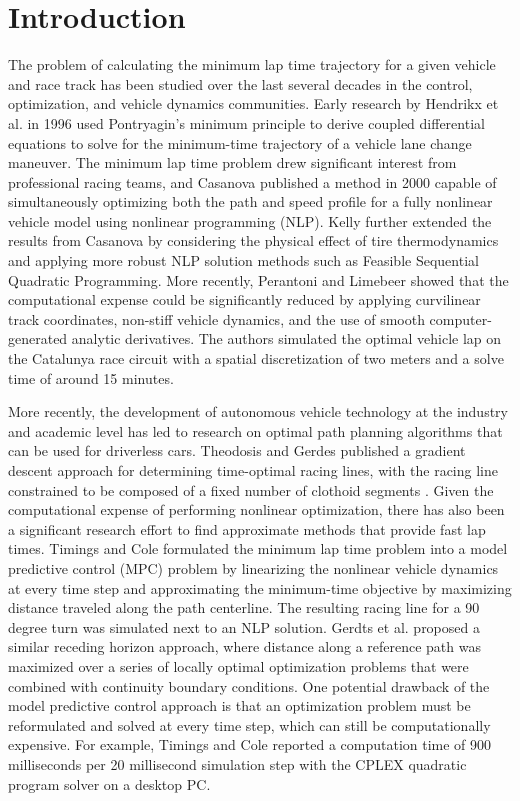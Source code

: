\documentclass[twocolumn,10pt]{asme2ej}
\begin{document}
\section{Introduction}
The problem of calculating the minimum lap time trajectory for a given vehicle and race track has been studied over the last several decades
in the control, optimization, and vehicle dynamics communities.  Early research by Hendrikx et al. \cite{hendrikx} in 1996 used 
 Pontryagin's minimum principle to derive coupled differential equations to solve for the minimum-time trajectory
of a vehicle lane change maneuver. The minimum lap time problem drew significant interest from professional racing teams, and
Casanova \cite{casanova} published a method in 2000 capable of simultaneously optimizing both the path and speed profile
for a fully nonlinear vehicle model using nonlinear programming (NLP). Kelly \cite{kelly} further extended the results from Casanova by considering
the physical effect of tire thermodynamics and applying more robust NLP solution methods such as Feasible Sequential Quadratic Programming. More recently,
Perantoni and Limebeer \cite{perantoni} showed that the computational expense could be significantly reduced by 
applying curvilinear track coordinates, non-stiff vehicle dynamics, and the use of smooth computer-generated
analytic derivatives. The authors simulated the optimal vehicle lap on the Catalunya race circuit with a spatial discretization
of two meters and a solve time of around 15 minutes. 

More recently, the development of autonomous vehicle technology at the industry and academic level has led to research on optimal path
 planning algorithms that can be used for driverless cars. Theodosis and Gerdes published a gradient descent approach for determining time-optimal
  racing lines, with the racing line constrained to be composed of a fixed number of clothoid segments \cite{theodosis}. Given the computational expense
 of performing nonlinear optimization, there has also been a significant research effort to find approximate methods that provide fast lap times.
 Timings and Cole \cite{timings} formulated the minimum lap time problem into a model predictive control (MPC) problem by linearizing the nonlinear vehicle
 dynamics at every time step and approximating the minimum-time objective by maximizing distance traveled along the path centerline. The resulting racing line
 for a 90 degree turn was simulated next to an NLP solution. Gerdts et al.  \cite{gerdts} proposed a similar receding horizon approach, where distance along a reference path was maximized over a series of locally optimal optimization
 problems that were combined with continuity boundary conditions. One potential drawback of the model predictive control approach is that an optimization
 problem must be reformulated and solved at every time step, which can still be computationally expensive. For example, Timings and Cole reported a computation time of 900 milliseconds
 per 20 millisecond simulation step with the CPLEX quadratic program solver on a desktop PC.
\end{document}
